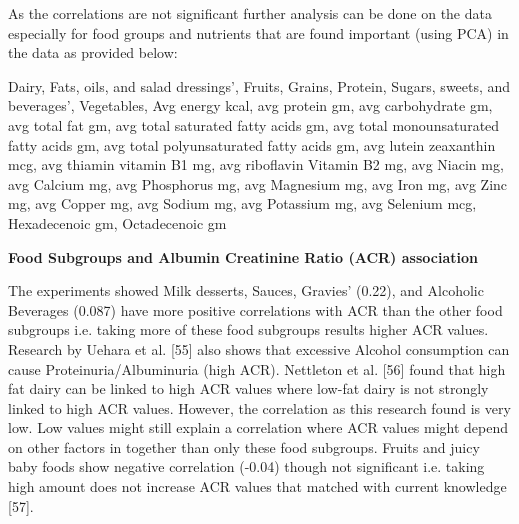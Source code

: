 \medskip 
\noindent As the correlations are not significant further analysis can be done on the data especially for food groups and nutrients that are found important (using PCA) in the data as provided below:


\medskip  
\noindent Dairy,  Fats, oils, and salad dressings’,  Fruits,  Grains,  Protein,   Sugars, sweets, and beverages’, Vegetables, Avg energy kcal,  avg protein gm,  avg carbohydrate gm,  avg total fat gm,  avg total saturated fatty acids gm, avg total monounsaturated fatty acids gm,  avg total polyunsaturated fatty acids gm, avg lutein zeaxanthin mcg,  avg thiamin vitamin B1 mg,  avg riboflavin Vitamin B2 mg,  avg Niacin mg, avg Calcium mg,  avg Phosphorus mg,  avg Magnesium mg,  avg Iron mg, avg Zinc mg,  avg Copper mg,  avg Sodium mg,  avg Potassium mg,  avg Selenium mcg,  Hexadecenoic gm,  Octadecenoic gm

\medskip 
\noindent \textbf{Food Subgroups and Albumin Creatinine Ratio (ACR) association}


\noindent The experiments showed  Milk desserts, Sauces, Gravies’ (0.22), and Alcoholic Beverages (0.087) have more positive correlations with ACR than the other food subgroups  i.e. taking more of these food subgroups results higher ACR values. Research by Uehara et al. [55] also shows that excessive Alcohol consumption can cause Proteinuria/Albuminuria (high ACR). Nettleton et al. [56] found that high fat dairy can be linked to high ACR values where low-fat dairy is not strongly linked to high ACR values. However, the correlation as this research found is very low. Low values might still explain a correlation where ACR values might depend on other factors in together than only these food subgroups. Fruits and juicy baby foods show negative correlation (-0.04) though not significant i.e. taking high amount does not increase ACR values that matched with current knowledge [57].

